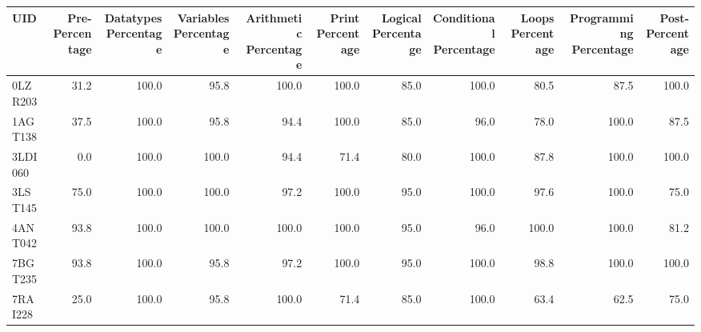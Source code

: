 \begin{tabular}{lrrrrrrrrrr}
\toprule
    UID &  Pre-Percentage &  Datatypes Percentage &  Variables Percentage &  Arithmetic Percentage &  Print Percentage &  Logical Percentage &  Conditional Percentage &  Loops Percentage &  Programming Percentage &  Post-Percentage \\
\midrule
0LZR203 &            31.2 &                 100.0 &                  95.8 &                  100.0 &             100.0 &                85.0 &                   100.0 &              80.5 &                    87.5 &            100.0 \\
1AGT138 &            37.5 &                 100.0 &                  95.8 &                   94.4 &             100.0 &                85.0 &                    96.0 &              78.0 &                   100.0 &             87.5 \\
3LDI060 &             0.0 &                 100.0 &                 100.0 &                   94.4 &              71.4 &                80.0 &                   100.0 &              87.8 &                   100.0 &            100.0 \\
3LST145 &            75.0 &                 100.0 &                 100.0 &                   97.2 &             100.0 &                95.0 &                   100.0 &              97.6 &                   100.0 &             75.0 \\
4ANT042 &            93.8 &                 100.0 &                 100.0 &                  100.0 &             100.0 &                95.0 &                    96.0 &             100.0 &                   100.0 &             81.2 \\
7BGT235 &            93.8 &                 100.0 &                  95.8 &                   97.2 &             100.0 &                95.0 &                   100.0 &              98.8 &                   100.0 &            100.0 \\
7RAI228 &            25.0 &                 100.0 &                  95.8 &                  100.0 &              71.4 &                85.0 &                   100.0 &              63.4 &                    62.5 &             75.0 \\
\bottomrule
\end{tabular}

